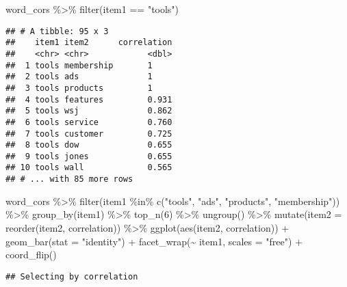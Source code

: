 \documentclass[
]{article}
\newenvironment{Shaded}{\begin{snugshade}}{\end{snugshade}}
\newcommand{\AttributeTok}[1]{\textcolor[rgb]{0.77,0.63,0.00}{#1}}
\newcommand{\DecValTok}[1]{\textcolor[rgb]{0.00,0.00,0.81}{#1}}
\newcommand{\FunctionTok}[1]{\textcolor[rgb]{0.00,0.00,0.00}{#1}}
\newcommand{\NormalTok}[1]{#1}
\newcommand{\SpecialCharTok}[1]{\textcolor[rgb]{0.00,0.00,0.00}{#1}}
\newcommand{\StringTok}[1]{\textcolor[rgb]{0.31,0.60,0.02}{#1}}
\begin{document}
\begin{Shaded}
\begin{Highlighting}[]
\NormalTok{word\_cors }\SpecialCharTok{\%\textgreater{}\%}
  \FunctionTok{filter}\NormalTok{(item1 }\SpecialCharTok{==} \StringTok{"tools"}\NormalTok{)}
\end{Highlighting}
\end{Shaded}

\begin{verbatim}
## # A tibble: 95 x 3
##    item1 item2      correlation
##    <chr> <chr>            <dbl>
##  1 tools membership       1    
##  2 tools ads              1    
##  3 tools products         1    
##  4 tools features         0.931
##  5 tools wsj              0.862
##  6 tools service          0.760
##  7 tools customer         0.725
##  8 tools dow              0.655
##  9 tools jones            0.655
## 10 tools wall             0.565
## # ... with 85 more rows
\end{verbatim}

\begin{Shaded}
\begin{Highlighting}[]
\NormalTok{word\_cors }\SpecialCharTok{\%\textgreater{}\%}
  \FunctionTok{filter}\NormalTok{(item1 }\SpecialCharTok{\%in\%} \FunctionTok{c}\NormalTok{(}\StringTok{"tools"}\NormalTok{, }\StringTok{"ads"}\NormalTok{, }\StringTok{"products"}\NormalTok{, }\StringTok{"membership"}\NormalTok{)) }\SpecialCharTok{\%\textgreater{}\%}
  \FunctionTok{group\_by}\NormalTok{(item1) }\SpecialCharTok{\%\textgreater{}\%}
  \FunctionTok{top\_n}\NormalTok{(}\DecValTok{6}\NormalTok{) }\SpecialCharTok{\%\textgreater{}\%}
  \FunctionTok{ungroup}\NormalTok{() }\SpecialCharTok{\%\textgreater{}\%}
  \FunctionTok{mutate}\NormalTok{(}\AttributeTok{item2 =} \FunctionTok{reorder}\NormalTok{(item2, correlation)) }\SpecialCharTok{\%\textgreater{}\%}
  \FunctionTok{ggplot}\NormalTok{(}\FunctionTok{aes}\NormalTok{(item2, correlation)) }\SpecialCharTok{+}
  \FunctionTok{geom\_bar}\NormalTok{(}\AttributeTok{stat =} \StringTok{"identity"}\NormalTok{) }\SpecialCharTok{+}
  \FunctionTok{facet\_wrap}\NormalTok{(}\SpecialCharTok{\textasciitilde{}}\NormalTok{ item1, }\AttributeTok{scales =} \StringTok{"free"}\NormalTok{) }\SpecialCharTok{+}
  \FunctionTok{coord\_flip}\NormalTok{()}
\end{Highlighting}
\end{Shaded}

\begin{verbatim}
## Selecting by correlation
\end{verbatim}
\end{document}
